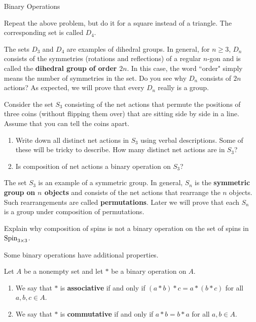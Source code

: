 \begin{section}{Binary Operations}
\begin{problem}\label{prob:introducing_D4}
Repeat the above problem, but do it for a square instead of a triangle.  The corresponding set is called $D_4$.
\end{problem}

The sets $D_3$ and $D_4$ are examples of dihedral groups. In general, for $n\geq 3$, $D_n$ consists of the symmetries (rotations and reflections) of a regular $n$-gon and is called the \textbf{dihedral group of order $2n$}. In this case, the word ``order" simply means the number of symmetries in the set. Do you see why $D_n$ consists of $2n$ actions? As expected, we will prove that every $D_n$ really is a group.

\begin{problem}\label{prob:introducing_S3}
Consider the set $S_3$ consisting of the net actions that permute the positions of three coins (without flipping them over) that are sitting side by side in a line.  Assume that you can tell the coins apart.
\begin{enumerate}[label=\textrm{(\alph*)}]
\item Write down all distinct net actions in $S_3$ using verbal descriptions. Some of these will be tricky to describe. How many distinct net actions are in $S_3$?
\item Is composition of net actions a binary operation on $S_3$?
\end{enumerate}
\end{problem}

The set $S_3$ is an example of a symmetric group. In general, $S_n$ is the \textbf{symmetric group on $n$ objects} and consists of the net actions that rearrange the $n$ objects. Such rearrangements are called \textbf{permutations}. Later we will prove that each $S_n$ is a group under composition of permutations.

\begin{problem}
Explain why composition of spins is not a binary operation on the set of spins in $\operatorname{Spin}_{3\times 3}$.
\end{problem}

Some binary operations have additional properties.

\begin{definition}
Let $A$ be a nonempty set and let $*$ be a binary operation on $A$.
\begin{enumerate}[label=\textrm{(\alph*)}]
\item We say that $*$ is \textbf{associative} if and only if $(a*b)*c=a*(b*c)$ for all $a,b,c\in A$.
\item We say that $*$ is \textbf{commutative} if and only if $a*b=b*a$ for all $a,b\in A$.
\end{enumerate}
\end{definition}


\end{section}
